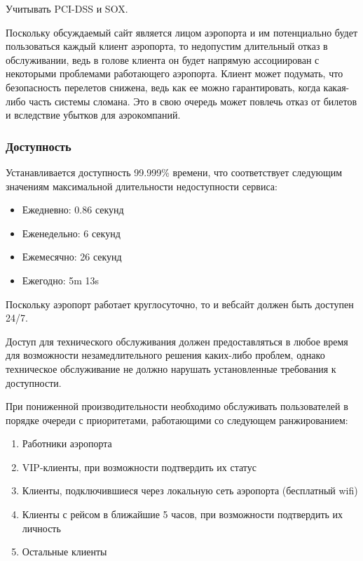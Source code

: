 Учитывать PCI-DSS и SOX.

Поскольку обсуждаемый сайт является лицом
аэропорта и им потенциально будет пользоваться
каждый клиент аэропорта, то недопустим
длительный отказ в обслуживании, ведь
в голове клиента он будет напрямую ассоциирован
с некоторыми проблемами работающего аэропорта.
Клиент может подумать, что безопасность перелетов
снижена, ведь как ее можно гарантировать, когда
какая-либо часть системы сломана. Это в свою очередь
может повлечь отказ от билетов и вследствие
убытков для аэрокомпаний.

\subsubsection{Доступность}

Устанавливается доступность 99.999\% времени,
что соответствует следующим значениям максимальной
длительности недоступности сервиса:
\begin{itemize}
      \item Ежедневно:   0.86 секунд
      \item Еженедельно: 6 секунд
      \item Ежемесячно:  26 секунд
      \item Ежегодно:    5m 13s
\end{itemize}

Поскольку аэропорт работает круглосуточно, то
и вебсайт должен быть доступен 24/7.

Доступ для технического обслуживания должен
предоставляться в любое время для возможности
незамедлительного решения каких-либо проблем,
однако техническое обслуживание не должно
нарушать установленные требования к доступности.

При пониженной производительности необходимо
обслуживать пользователей в порядке очереди
с приоритетами, работающими со следующем
ранжированием:
\begin{enumerate}
      \item Работники аэропорта
      \item VIP-клиенты, при возможности
            подтвердить их статус
      \item Клиенты, подключившиеся через
            локальную сеть аэропорта (бесплатный wifi)
      \item Клиенты с рейсом в ближайшие 5 часов,
            при возможности подтвердить их личность
      \item Остальные клиенты
\end{enumerate}

